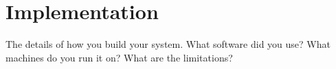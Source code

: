 \section{Implementation}

The details of how you build your system.  What software did you use?  What
machines do you run it on?  What are the limitations?
